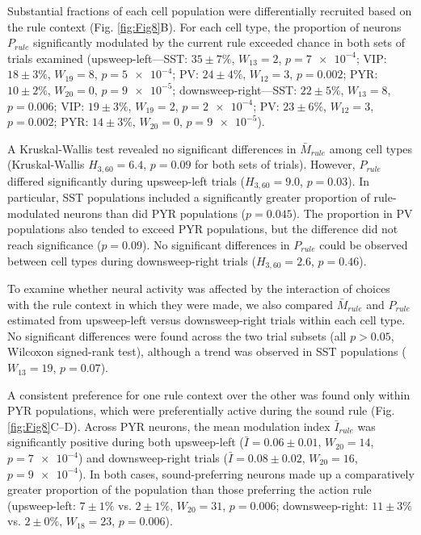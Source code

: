 Substantial fractions of each cell population were differentially recruited based on the rule context (Fig. \ref{fig:Fig8}B). For each cell type, the proportion of neurons $P_{\mathit{rule}}$ significantly modulated by the current rule exceeded chance in both sets of trials examined (upsweep-left---SST: $35\pm7\%$, $W_{13}=2$, $p=\num{7e-4}$; VIP: $18\pm3\%$, $W_{19}=8$, $p=\num{5e-4}$; PV: $24\pm4\%$, $W_{12}=3$, $p=\num{0.002}$; PYR: $10\pm2\%$, $W_{20}=0$, $p=\num{9e-5}$; downsweep-right---SST: $22\pm5\%$, $W_{13}=8$, $p=\num{0.006}$; VIP: $19\pm3\%$, $W_{19}=2$, $p=\num{2e-4}$; PV: $23\pm6\%$, $W_{12}=3$, $p=\num{0.002}$; PYR: $14\pm3\%$, $W_{20}=0$, $p=\num{9e-5}$). 

A Kruskal-Wallis test revealed no significant differences in $\bar{M}_{\mathit{rule}}$ among cell types (Kruskal-Wallis $H_{3,60}=6.4$, $p=0.09$ for both sets of trials). However, $P_{\mathit{rule}}$ differed significantly during upsweep-left trials ($H_{3,60}=9.0$, $p=0.03$). In particular, SST populations included a significantly greater proportion of rule-modulated neurons than did PYR populations ($p=0.045$). The proportion in PV populations also tended to exceed PYR populations, but the difference did not reach significance ($p=0.09$). No significant differences in $P_{\mathit{rule}}$ could be observed between cell types during downsweep-right trials ($H_{3,60}=2.6$, $p=0.46$).

To examine whether neural activity was affected by the interaction of choices with the rule context in which they were made, we also compared $\bar{M}_{\mathit{rule}}$ and $P_{\mathit{rule}}$ estimated from upsweep-left versus downsweep-right trials within each cell type. No significant differences were found across the two trial subsets (all $p>0.05$, Wilcoxon signed-rank test), although a trend was observed in SST populations ($W_{13}=19$, $p=0.07$).

A consistent preference for one rule context over the other was found only within PYR populations, which were preferentially active during the sound rule (Fig. \ref{fig:Fig8}C--D). Across PYR neurons, the mean modulation index $\bar{I}_{rule}$ was significantly positive during both upsweep-left ($\bar{I}=0.06\pm0.01$, $W_{20}=14$, $p=\num{7e-4}$) and downsweep-right trials ($\bar{I}=0.08\pm0.02$, $W_{20}=16$, $p=\num{9e-4}$). In both cases, sound-preferring neurons made up a comparatively greater proportion of the population than those preferring the action rule (upsweep-left: $7\pm1\%$ vs. $2\pm1\%$, $W_{20}=31$, $p=\num{0.006}$; downsweep-right: $11\pm3\%$ vs. $2\pm0\%$, $W_{18}=23$, $p=\num{0.006}$). 

